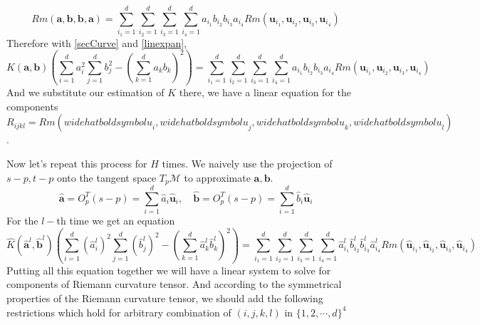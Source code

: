 \documentclass{article}
\begin{document}
\begin{equation}
	Rm(\boldsymbol{a},\boldsymbol{b},\boldsymbol{b},\boldsymbol{a})=\sum_{i_1=1}^d\sum_{i_2=1}^d\sum_{i_3=1}^d\sum_{i_4=1}^da_{i_1}b_{i_2}b_{i_3}a_{i_4}Rm(\boldsymbol{u}_{i_1},\boldsymbol{u}_{i_2},\boldsymbol{u}_{i_3},\boldsymbol{u}_{i_4})
	\label{linexpan}
\end{equation}
Therefore with \ref{secCurve} and \ref{linexpan},
\begin{equation}
	K(\boldsymbol{a},\boldsymbol{b})\left(\sum_{i=1}^da_i^2\sum_{j=1}^db_j^2-(\sum_{k=1}^da_kb_k)^2\right)=\sum_{i_1=1}^d\sum_{i_2=1}^d\sum_{i_3=1}^d\sum_{i_4=1}^da_{i_1}b_{i_2}b_{i_3}a_{i_4}Rm(\boldsymbol{u}_{i_1},\boldsymbol{u}_{i_2},\boldsymbol{u}_{i_3},\boldsymbol{u}_{i_4})
	\label{Maineq}
\end{equation}
And we substitute our estimation of $K$ there, we have a linear equation for the components $R_{ijkl}=Rm(widehat{boldsymbol{u}}_i,widehat{boldsymbol{u}}_j,widehat{boldsymbol{u}}_k,widehat{boldsymbol{u}}_l)$.
\par
Now let's repeat this process for $H$ times. We naively use the projection of $s-p,t-p$ onto the tangent space $T_p\mathcal{M}$ to approximate $\boldsymbol{a},\boldsymbol{b}$. 
\begin{equation}
	\widehat{\boldsymbol{a}}=O_p^T(s-p)=\sum_{i=1}^d\widehat{a}_i\widehat{\boldsymbol{u}}_i,\quad \widehat{\boldsymbol{b}}=O_p^T(s-p)=\sum_{i=1}^d\widehat{b}_i\widehat{\boldsymbol{u}}_i
	\label{expandabest}
\end{equation}
For the $l-$th time we get an equation
\begin{equation}
	\widehat{K}(\widehat{\boldsymbol{a}}^{l},\widehat{\boldsymbol{b}}^l)\left(\sum_{i=1}^d(\widehat{a}_i^{l})^2\sum_{j=1}^d(\widehat{b}_j^l)^2-(\sum_{k=1}^d\widehat{a}_k^l\widehat{b}_k^l)^2\right)=\sum_{i_1=1}^d\sum_{i_2=1}^d\sum_{i_3=1}^d\sum_{i_4=1}^d\widehat{a}_{i_1}^l\widehat{b}_{i_2}^l\widehat{b}_{i_3}^l\widehat{a}_{i_4}^lRm(\widehat{\boldsymbol{u}}_{i_1},\widehat{\boldsymbol{u}}_{i_2},\widehat{\boldsymbol{u}}_{i_3},\widehat{\boldsymbol{u}}_{i_4})
	\label{Mainesteq}
\end{equation}
Putting all this equation together we will have a linear system to solve for components of Riemann curvature tensor. And according to the symmetrical properties of the Riemann curvature tensor, we should add the following restrictions which hold for arbitrary combination of $(i,j,k,l)$ in $\{1,2,\cdots,d\}^4$
\end{document}
